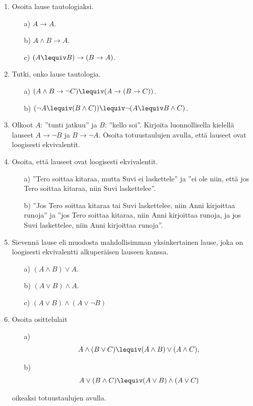 \begin{enumerate}

\item Osoita lause tautologiaksi.
\begin{itemize}
\item[a)] $A\to A$.
\item[b)] $A\land B \to A$.
\item[c)] $(A\lequiv B) \to (B\to A)$.

\end{itemize}

\item Tutki, onko lause tautologia.
\begin{itemize}
\item[a)] $(A\land B \to \lnot C)\lequiv (A\to(B\to C))$.
\item[b)] $(\lnot A \lequiv (B \land C)) \lequiv \lnot (A
\lequiv B \land C)$.
\end{itemize}

\item Olkoot $A$: ''tunti jatkuu'' ja $B$: ''kello soi''.
Kirjoita luonnollisella kielellä lauseet $A\to \lnot B$
ja $B\to \lnot A$. Osoita totuustaulujen avulla, että
lauseet ovat loogisesti ekvivalentit.

\item Osoita, että lauseet ovat loogisesti ekvivalentit.
\begin{itemize}
\item[a)] ''Tero soittaa kitaraa, mutta Suvi ei
laskettele'' ja ''ei ole niin, että jos Tero soittaa
kitaraa, niin Suvi laskettelee''.
\item[b)] ''Jos Tero soittaa kitaraa tai Suvi laskettelee,
niin Anni kirjoittaa runoja'' ja ''jos Tero soittaa
kitaraa, niin Anni kirjoittaa runoja, ja jos Suvi
laskettelee, niin Anni kirjoittaa runoja''.
\end{itemize}

\item Sievennä lause eli muodosta mahdollisimman
yksinkertainen lause, joka on loogisesti ekvivalentti
alkuperäisen lauseen kanssa.
\begin{itemize}
\item[a)] $(A\land B) \lor A$.
\item[b)] $(A\lor B) \land A$.
\item[c)] $(A\lor B) \land (A\lor \lnot B)$
\end{itemize}

\item Osoita osittelulait
\begin{itemize}
\item[a)]
\[
A \land (B \lor C) \lequiv (A \land B) \lor (A\land C),
\]
\item[b)]
\[
A \lor (B \land C) \lequiv (A \lor B) \land (A\lor C)
\]
\end{itemize}
oikeaksi totuustaulujen avulla.


\end{enumerate}
